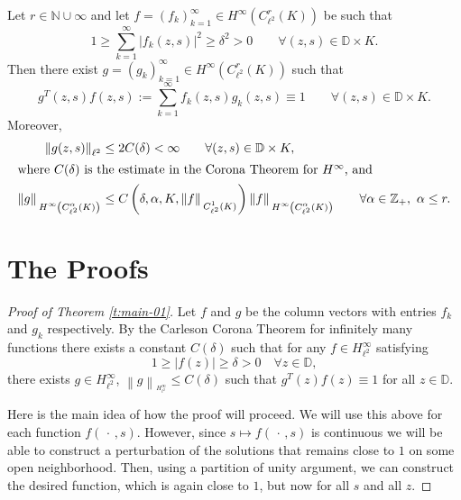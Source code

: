 \documentclass[12pt]{amsart}
\begin{document}
{\begin{list}{X}
{\begin{thm}
\label{t:main-02}
Let $r\in{\mathbb{N}}\cup\infty$ and let $f =(f_k)_{k=1}^\infty \in H^\infty\left(C^r_{\ell^2}(K)\right)$ be such that 
\[
1\ge \sum_{k=1}^\infty \left|f_k(z, s)\right|^2\ge\delta^2 >0\qquad \forall (z,s)\in {\mathbb{D}}\times K. 
\] 
Then there exist $g=(g_k)_{k=1}^\infty \in H^\infty\left(C^r_{\ell^2}(K)\right)$ such that 
\[
g^T(z,s) f(z,s) := \sum_{k=1}^\infty f_k(z,s) g_k(z,s) \equiv 1\qquad \forall (z,s)\in {\mathbb{D}}\times K. 
\]
Moreover,
\begin{align}
\label{SolEst-03}
\left\|g(z, s)\right\|_{\ell^2} 
& \le 2C(\delta) <\infty \qquad \forall (z,s)\in {\mathbb{D}}\times K,  \\
\intertext{where $C(\delta) $ is the estimate in the Corona Theorem for $H^\infty$, and}
\label{SolEst-04}
\left\|g\right\|{_{ {}_{\scriptstyle {H^\infty\left(C_{\ell^2}^\alpha(K)\right)}}}}  
& \le C\left(\delta, \alpha, K,  \left\| f\right\|{_{ {}_{\scriptstyle {C^1_{\ell^2}(K)}}}}\right)  \left\|f\right\|{_{ {}_{\scriptstyle {H^\infty\left(C_{\ell^2}^\alpha(K)\right)}}}} \qquad \forall \alpha\in{\mathbb{Z}}_+, \ \alpha \le r.
\end{align}
\end{thm}
\section{The Proofs}
\label{s:proof}

\begin{proof}[Proof of Theorem \ref{t:main-01}]
Let $f$ and $g$ be the column vectors with entries $f_k$ and $g_k$ respectively. By the Carleson Corona Theorem for infinitely many functions there exists a constant $C(\delta)$ such that for any $f\in H^\infty_{\ell^2}$ satisfying 
\[
1\ge \left|f(z)\right|\ge\delta>0\quad\forall z\in{\mathbb{D}},
\]
there exists $g\in H^\infty_{\ell^2}$, $\left\|g\right\|{_{ {}_{\scriptstyle {H^\infty_{\ell^2}}}}} \le C(\delta)$ such that $g^T(z) f(z) \equiv 1$ for all $z\in {\mathbb{D}}$.  

Here is the main idea of how the proof will proceed.  We will use this above for each function $f({\,\cdot\,}, s)$.  However, since $s\mapsto f({\,\cdot\,}, s)$ is continuous we will be able to construct a perturbation of the solutions that remains close to $1$ on some open neighborhood.  Then, using a partition of unity argument, we can construct the desired function, which is again close to $1$, but now for all $s$ and all $z$. 


\end{proof}}
\end{list}}
\end{document}
